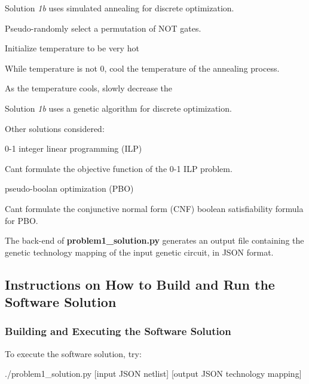 Solution {\itshape 1b} uses simulated annealing for discrete optimization.
\begin{DoxyItemize}
\item Pseudo-\/randomly select a permutation of N\+O\+T gates.
\item Initialize temperature to be very hot
\item While temperature is not 0, cool the temperature of the annealing process.
\begin{DoxyItemize}
\item As the temperature cools, slowly decrease the
\end{DoxyItemize}
\end{DoxyItemize}

Solution {\itshape 1b} uses a genetic algorithm for discrete optimization.

Other solutions considered\+:
\begin{DoxyItemize}
\item 0-\/1 integer linear programming (I\+L\+P)
\begin{DoxyItemize}
\item Can\textquotesingle{}t formulate the objective function of the 0-\/1 I\+L\+P problem.
\end{DoxyItemize}
\item pseudo-\/boolan optimization (P\+B\+O)
\begin{DoxyItemize}
\item Can\textquotesingle{}t formulate the conjunctive normal form (C\+N\+F) boolean satisfiability formula for P\+B\+O.
\end{DoxyItemize}
\end{DoxyItemize}

The back-\/end of {\bfseries problem1\+\_\+solution.\+py} generates an output file containing the genetic technology mapping of the input genetic circuit, in J\+S\+O\+N format.

\subsection*{Instructions on How to Build and Run the Software Solution}

\subsubsection*{Building and Executing the Software Solution}

To execute the software solution, try\+: \begin{DoxyVerb}./problem1_solution.py [input JSON netlist] [output JSON technology mapping]
\end{DoxyVerb}


